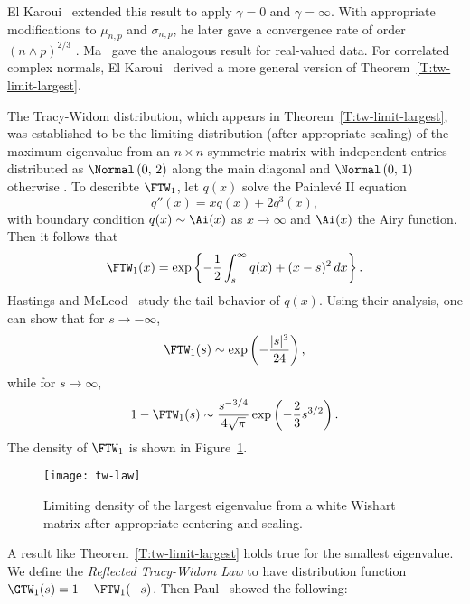 \noindent
El Karoui~\cite{elkaroui2003lew} extended this result to apply $\gamma = 0$ and $\gamma = \infty$.  With appropriate modifications to $\mu_{n,p}$ and $\sigma_{n,p}$, he later gave a convergence rate of order $(n \wedge p)^{2/3}$ \cite{elkaroui2006mpt}.  Ma~\cite{ma2008atw} gave the analogous result for real-valued data.  For correlated complex normals, El Karoui~\cite{elkaroui2007twl} derived a more general version of Theorem~\ref{T:tw-limit-largest}.  

The Tracy-Widom distribution, which appears in Theorem~\ref{T:tw-limit-largest}, was  established to be the limiting distribution (after appropriate scaling) of the maximum eigenvalue from an $n \times n$ symmetric matrix with independent entries distributed as $\Normal\left( 0, \, 2 \right)$ along the main diagonal and $\Normal\left( 0, \, 1 \right)$ otherwise \cite{tracy1994lsd} \cite{tracy1996oas}.  To describte $\FTW_1$, let $q(x)$ solve the Painlev\'e II equation
\[
    q''(x) = x q(x) + 2 q^3(x),
\]
with boundary condition $q(x) \sim \Ai(x)$ as $x \to \infty$ and $\Ai(x)$ the Airy function.  Then it follows that
\[
    \FTW_1(x)
    =
    \exp \left\{
        -
        \frac{1}{2}
        \int_s^\infty
            q(x)
            +
            (x-s)^2
            \,
            dx
    \right\}.
\]
Hastings and McLeod~\cite{hastings1980bvp} study the tail behavior of $q(x)$.  Using their analysis, one can show \cite{perry2009mre} that for $s \to -\infty$, 
\[
    \FTW_1(s)
    \sim
    \exp \left(
        -\frac{|s|^3}{24}
    \right),
\]
while for $s \to \infty$,
\[
    1 - \FTW_1(s)
    \sim
    \frac{ s^{-3/4} }
         { 4 \sqrt{ \pi } }
    \exp \left(
        -
        \frac{2}{3}
        s^{3/2}
    \right).
\]
The density of $\FTW_1$ is shown in Figure~\ref{F:tw-density}.

\begin{figure}
    \centering
    \texttt{[image: tw-law]}
    \caption{
        Limiting density of the largest eigenvalue from a white Wishart
        matrix after appropriate centering and scaling.
    }
    \label{F:tw-density}
\end{figure}

A result like Theorem~\ref{T:tw-limit-largest} holds true for the smallest eigenvalue.  We define the \emph{Reflected Tracy-Widom Law} to have distribution function $\GTW_1(s) = 1 - \FTW_1(-s)$.  Then Paul~\cite{paul2006dse} showed the following:

